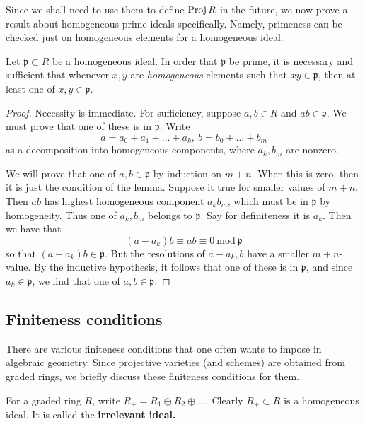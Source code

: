 Since we shall need to use them to define $\operatorname{Proj} R$ in the future, we now
prove a result about homogeneous prime ideals specifically. Namely, primeness
can be checked just on homogeneous elements for a homogeneous ideal.
\begin{lemma} \label{homogeneousprimeideal}
Let $\mathfrak{p} \subset R$ be a homogeneous ideal. In order that $\mathfrak{p}$ be prime, it is
necessary and sufficient that whenever $x,y$ are \emph{homogeneous} elements
such that $xy \in \mathfrak{p}$, then at least one of $x,y \in \mathfrak{p}$.
\end{lemma} 
\begin{proof} 
Necessity is immediate. For sufficiency, suppose $a,b  \in R$ and $ab \in
\mathfrak{p}$. We must prove that one of these is in $\mathfrak{p}$. Write 
\[  a = a_0 + a_1  + \dots + a_k,  \ b = b_0 + \dots + b_m  \]
as a decomposition into homogeneous components, where $a_k, b_m$ are nonzero.

We will prove that one of $a,b \in \mathfrak{p}$ by induction on $m+n$. When this is
zero, then it is just the condition of the lemma.
Suppose it true for smaller values of $m+n$.
Then $ab$ has highest homogeneous component $a_k b_m$, which must be in $\mathfrak{p}$
by homogeneity.  Thus one of $a_k, b_m$ belongs to $\mathfrak{p}$. Say for
definiteness it is $a_k$. Then we have that
\[  (a-a_k)b \equiv ab \equiv 0 \  \mathrm{mod} \  \mathfrak{p}  \]
so that $(a-a_k)b \in \mathfrak{p}$. But the resolutions of $a-a_k, b$ have a smaller
$m+n$-value. By the inductive hypothesis, it follows that one of these is in
$\mathfrak{p}$, and since $a_k \in \mathfrak{p}$, we find that one of $a,b \in \mathfrak{p}$.  
\end{proof} 

\subsection{Finiteness conditions}
There are various finiteness conditions that one often wants to impose in
algebraic geometry.
Since projective varieties (and schemes) are obtained from graded rings,
we briefly discuss these finiteness conditions for them.

For a graded ring $R$, write $R_+ = R_1 \oplus R_2 \oplus \dots$. Clearly $R_+
\subset R$ is a homogeneous ideal. It is called the \textbf{irrelevant ideal.}

